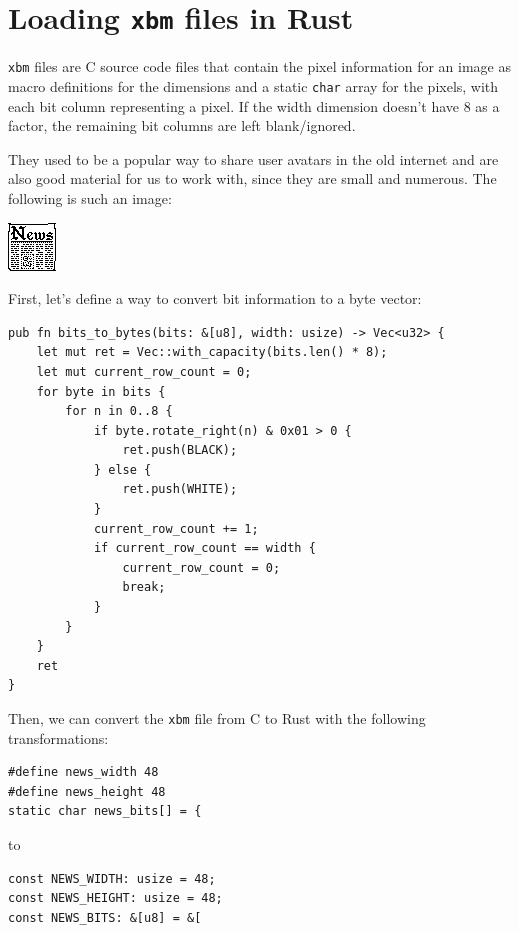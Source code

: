 \documentclass[12pt,a4,oneside,usenames,dvipsnames]{book}
\begin{document}
\section{Loading \texttt{xbm} files in Rust}

\texttt{xbm} files are C source code files that contain the pixel information for an image as macro definitions for the dimensions and a static \texttt{char} array for the pixels, with each bit column representing a pixel. If the width dimension doesn't have 8 as a factor, the remaining bit columns are left blank/ignored.

They used to be a popular way to share user avatars in the old internet and are also good material for us to work with, since they are small and numerous. The following is such an image:

\begin{center}
\includegraphics{figures/news.png}
\end{center}

First, let's define a way to convert bit information to a byte vector:

\begin{verbatim}
pub fn bits_to_bytes(bits: &[u8], width: usize) -> Vec<u32> {
    let mut ret = Vec::with_capacity(bits.len() * 8);
    let mut current_row_count = 0;
    for byte in bits {
        for n in 0..8 {
            if byte.rotate_right(n) & 0x01 > 0 {
                ret.push(BLACK);
            } else {
                ret.push(WHITE);
            }
            current_row_count += 1;
            if current_row_count == width {
                current_row_count = 0;
                break;
            }
        }
    }
    ret
}
\end{verbatim}

Then, we can convert the \texttt{xbm} file from C to Rust with the following transformations:

\begin{verbatim}
#define news_width 48
#define news_height 48
static char news_bits[] = {
\end{verbatim}

to


\begin{verbatim}
const NEWS_WIDTH: usize = 48;
const NEWS_HEIGHT: usize = 48;
const NEWS_BITS: &[u8] = &[
\end{verbatim}
\end{document}
